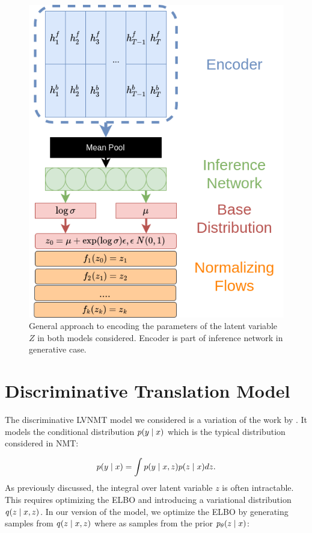 \begin{figure}
	\includegraphics[width=\linewidth]{LatentZEncoding.png}
	\caption{General approach to encoding the parameters of the latent variable $Z$ in both models considered. Encoder is part of inference network in generative case.}
	\label{fig:latentZ}
\end{figure}


\section{Discriminative Translation Model}


The discriminative \ac{LVNMT} model we considered is a variation of the work by \citet{Zhang2016VNMT}. It models the conditional distribution $p(y \; | \;{x})$ which is the typical distribution considered in \ac{NMT}:

\begin{equation}
p(y \; | \;{x})  = \int p(y \; | \;{x,z}) p(z \; | \;{x}) dz.
\end{equation}
As previously discussed, the integral over latent variable $z$ is often intractable. This requires optimizing the \ac{ELBO} and introducing a variational distribution $q(z \; | \;{x,z})$.
In our version of the model, we optimize the \ac{ELBO} by generating samples from $q(z \; | \;{x,z})$ where as \cite{Zhang2016VNMT} samples from the prior $p_{\theta}(z \; | \;{x})$:  %

